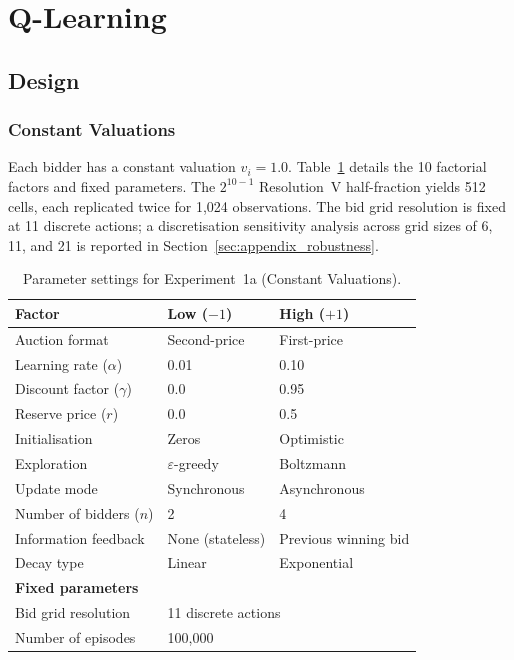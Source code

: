 \section{Q-Learning}
\label{sec:qlearning_results}

\subsection{Design}
\label{sec:appendix_design}

\subsubsection{Constant Valuations}

Each bidder has a constant valuation $v_i=1.0$. Table~\ref{tab:exp1a_params} details the 10 factorial factors and fixed parameters. The $2^{10-1}$ Resolution~V half-fraction yields 512 cells, each replicated twice for 1{,}024 observations. The bid grid resolution is fixed at 11 discrete actions; a discretisation sensitivity analysis across grid sizes of 6, 11, and 21 is reported in Section~\ref{sec:appendix_robustness}.

\begin{table}[h]
\centering
\caption{Parameter settings for Experiment~1a (Constant Valuations).}
\label{tab:exp1a_params}
\begin{tabular}{l l l}
\toprule
\textbf{Factor} & \textbf{Low ($-1$)} & \textbf{High ($+1$)}\\
\midrule
Auction format & Second-price & First-price \\
Learning rate ($\alpha$) & 0.01 & 0.10 \\
Discount factor ($\gamma$) & 0.0 & 0.95 \\
Reserve price ($r$) & 0.0 & 0.5 \\
Initialisation & Zeros & Optimistic \\
Exploration & $\varepsilon$-greedy & Boltzmann \\
Update mode & Synchronous & Asynchronous \\
Number of bidders ($n$) & 2 & 4 \\
Information feedback & None (stateless) & Previous winning bid \\
Decay type & Linear & Exponential \\
\midrule
\multicolumn{3}{l}{\textbf{Fixed parameters}} \\
\midrule
Bid grid resolution & \multicolumn{2}{l}{11 discrete actions\footnotemark} \\
Number of episodes & \multicolumn{2}{l}{100{,}000} \\
\bottomrule
\end{tabular}
\end{table}

